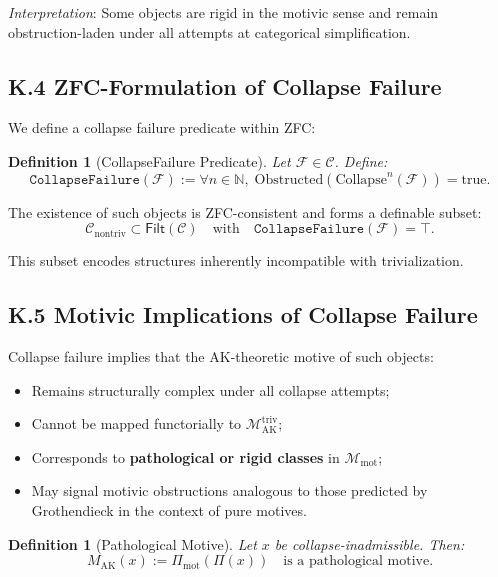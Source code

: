 \documentclass[11pt]{article}
\newtheorem{definition}[theorem]{Definition}
\begin{document}
\textit{Interpretation}: Some objects are rigid in the motivic sense and remain obstruction-laden under all attempts at categorical simplification.

\subsection*{K.4 ZFC-Formulation of Collapse Failure}

We define a collapse failure predicate within ZFC:

\begin{definition}[CollapseFailure Predicate]
Let $\mathcal{F} \in \mathcal{C}$. Define:
\[
\texttt{CollapseFailure}(\mathcal{F}) := \forall n \in \mathbb{N}, \; \mathrm{Obstructed}(\mathrm{Collapse}^n(\mathcal{F})) = \mathrm{true}.
\]
\end{definition}

The existence of such objects is ZFC-consistent and forms a definable subset:
\[
\mathcal{C}_{\mathrm{nontriv}} \subset \mathsf{Filt}(\mathcal{C})
\quad \text{with} \quad
\texttt{CollapseFailure}(\mathcal{F}) = \top.
\]

This subset encodes structures inherently incompatible with trivialization.

\subsection*{K.5 Motivic Implications of Collapse Failure}

Collapse failure implies that the AK-theoretic motive of such objects:

\begin{itemize}
    \item Remains structurally complex under all collapse attempts;
    \item Cannot be mapped functorially to $\mathcal{M}_{\mathrm{AK}}^{\mathrm{triv}}$;
    \item Corresponds to \textbf{pathological or rigid classes} in $\mathcal{M}_{\mathrm{mot}}$;
    \item May signal motivic obstructions analogous to those predicted by Grothendieck in the context of pure motives.
\end{itemize}

\begin{definition}[Pathological Motive]
Let $x$ be collapse-inadmissible. Then:
\[
M_{\mathrm{AK}}(x) := \Pi_{\mathrm{mot}}(\Pi(x))
\quad \text{is a pathological motive.}
\]
\end{definition}
\end{document}
